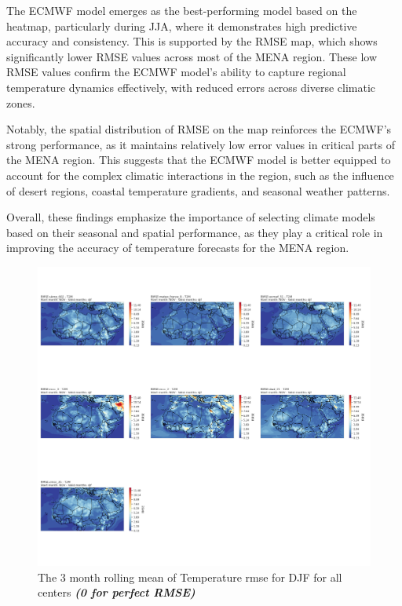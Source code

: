 The ECMWF model emerges as the best-performing model based on the heatmap, particularly during JJA, where it demonstrates high predictive accuracy and consistency. This is supported by the RMSE map, which shows significantly lower RMSE values across most of the MENA region. These low RMSE values confirm the ECMWF model's ability to capture regional temperature dynamics effectively, with reduced errors across diverse climatic zones.

Notably, the spatial distribution of RMSE on the map reinforces the ECMWF's strong performance, as it maintains relatively low error values in critical parts of the MENA region. This suggests that the ECMWF model is better equipped to account for the complex climatic interactions in the region, such as the influence of desert regions, coastal temperature gradients, and seasonal weather patterns.

Overall, these findings emphasize the importance of selecting climate models based on their seasonal and spatial performance, as they play a critical role in improving the accuracy of temperature forecasts for the MENA region.



\begin{figure}[H]
    \centering
    \includegraphics[width=1\linewidth]{plots/det/rmse/rmse_djf_t2m.png}
    \caption{The 3 month rolling mean of Temperature rmse for DJF for all centers \textbf{\textit{(0 for perfect RMSE)} }}
\end{figure}

